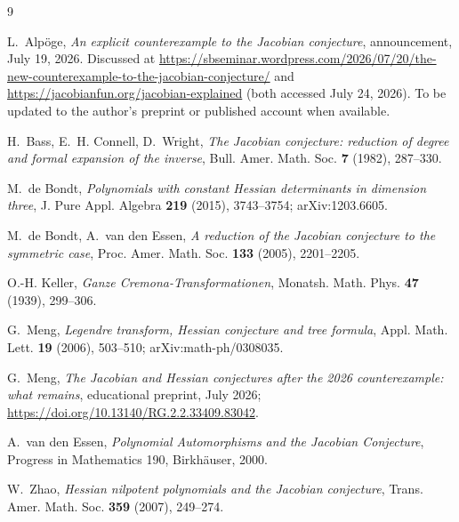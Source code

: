 \documentclass[11pt]{article}
\theoremstyle{plain}
\theoremstyle{definition}
\begin{document}
\begin{thebibliography}{9}

L.~Alp\"oge,
\emph{An explicit counterexample to the Jacobian conjecture},
announcement, July 19, 2026. Discussed at
\url{https://sbseminar.wordpress.com/2026/07/20/the-new-counterexample-to-the-jacobian-conjecture/}
and \url{https://jacobianfun.org/jacobian-explained}
(both accessed July 24, 2026). To be updated to the author's preprint or
published account when available.

H.~Bass, E.~H. Connell, D.~Wright,
\emph{The Jacobian conjecture: reduction of degree and formal expansion
of the inverse},
Bull. Amer. Math. Soc. \textbf{7} (1982), 287--330.

M.~de Bondt,
\emph{Polynomials with constant Hessian determinants in dimension
three}, J. Pure Appl. Algebra \textbf{219} (2015), 3743--3754;
arXiv:1203.6605.

M.~de Bondt, A.~van den Essen,
\emph{A reduction of the Jacobian conjecture to the symmetric case},
Proc. Amer. Math. Soc. \textbf{133} (2005), 2201--2205.

O.-H. Keller,
\emph{Ganze Cremona-Transformationen},
Monatsh. Math. Phys. \textbf{47} (1939), 299--306.

G.~Meng,
\emph{Legendre transform, Hessian conjecture and tree formula},
Appl. Math. Lett. \textbf{19} (2006), 503--510;
arXiv:math-ph/0308035.

G.~Meng,
\emph{The Jacobian and Hessian conjectures after the 2026
counterexample: what remains}, educational preprint, July 2026;
\url{https://doi.org/10.13140/RG.2.2.33409.83042}.

A.~van den Essen,
\emph{Polynomial Automorphisms and the Jacobian Conjecture},
Progress in Mathematics 190, Birkh\"auser, 2000.

W.~Zhao,
\emph{Hessian nilpotent polynomials and the Jacobian conjecture},
Trans. Amer. Math. Soc. \textbf{359} (2007), 249--274.

\end{thebibliography}
\end{document}

